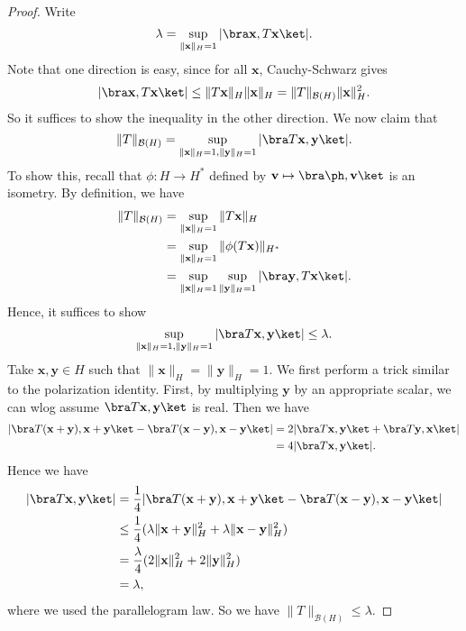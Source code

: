 \documentclass[a4paper]{article}
\begin{document}
\begin{proof}
  Write
  \[
    \lambda = \sup_{\|\mathbf{x}\|_H = 1} |\bra \mathbf{x}, T \mathbf{x}\ket|.
  \]
  Note that one direction is easy, since for all $\mathbf{x}$, Cauchy-Schwarz gives
  \[
    |\bra \mathbf{x}, T \mathbf{x}\ket| \leq \|T\mathbf{x}\|_H \|\mathbf{x}\|_H = \|T\|_{\mathcal{B}(H)} \|\mathbf{x}\|_H^2.
  \]
  So it suffices to show the inequality in the other direction. We now claim that
  \[
    \|T\|_{\mathcal{B}(H)} = \sup_{\|\mathbf{x}\|_H = 1, \|\mathbf{y}\|_H = 1} |\bra T\mathbf{x}, \mathbf{y}\ket|.
  \]
  To show this, recall that $\phi: H \to H^*$ defined by $\mathbf{v} \mapsto \bra \ph, \mathbf{v}\ket$ is an isometry. By definition, we have
  \begin{align*}
    \|T\|_{\mathcal{B}(H)} &= \sup_{\|\mathbf{x}\|_H = 1} \|T \mathbf{x}\|_H \\
    &= \sup_{\|\mathbf{x}\|_H = 1} \|\phi(T \mathbf{x})\|_{H^*}\\
    &= \sup_{\|\mathbf{x}\|_H = 1}\sup_{\|\mathbf{y}\|_H = 1} |\bra \mathbf{y}, T \mathbf{x}\ket|.
  \end{align*}
  Hence, it suffices to show
  \[
    \sup_{\|\mathbf{x}\|_H = 1, \|\mathbf{y}\|_H = 1} |\bra T\mathbf{x}, \mathbf{y}\ket| \leq \lambda.
  \]
  Take $\mathbf{x}, \mathbf{y} \in H$ such that $\|\mathbf{x}\|_H = \|\mathbf{y}\|_H = 1$. We first perform a trick similar to the polarization identity. First, by multiplying $\mathbf{y}$ by an appropriate scalar, we can wlog assume $\bra T\mathbf{x}, \mathbf{y}\ket$ is real. Then we have
  \begin{align*}
    |\bra T(\mathbf{x} + \mathbf{y}), \mathbf{x} + \mathbf{y} \ket - \bra T(\mathbf{x} - \mathbf{y}), \mathbf{x} - \mathbf{y}\ket| &= 2 |\bra T\mathbf{x}, \mathbf{y}\ket + \bra T \mathbf{y}, \mathbf{x}\ket|\\
    &= 4 |\bra T \mathbf{x}, \mathbf{y}\ket|.
  \end{align*}
  Hence we have
  \begin{align*}
    |\bra T \mathbf{x}, \mathbf{y}\ket| &= \frac{1}{4}|\bra T(\mathbf{x} + \mathbf{y}), \mathbf{x} + \mathbf{y} \ket - \bra T(\mathbf{x} - \mathbf{y}), \mathbf{x} - \mathbf{y}\ket|\\
    &\leq \frac{1}{4} (\lambda \|\mathbf{x} + \mathbf{y}\|_H^2 + \lambda \|\mathbf{x} - \mathbf{y}\|_H^2)\\
    &= \frac{\lambda}{4} (2\|\mathbf{x}\|_H^2 + 2 \|\mathbf{y}\|_H^2)\\
    &= \lambda,
  \end{align*}
  where we used the parallelogram law. So we have $\|T\|_{\mathcal{B}(H)} \leq \lambda$.
\end{proof}
\end{document}
